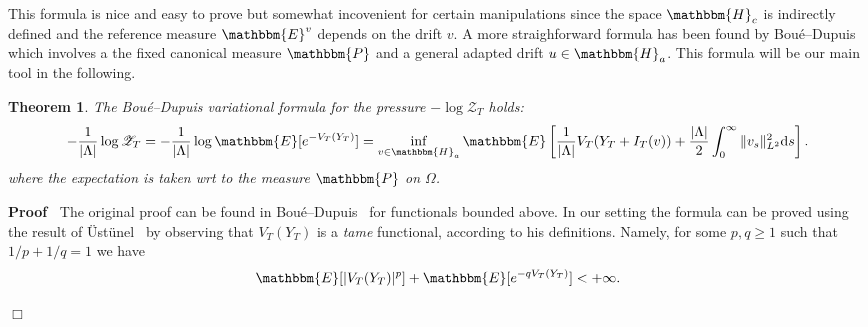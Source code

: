 \documentclass[11pt, oneside]{article}   	%
\newcommand{\mathd}{\mathrm{d}}
\newcommand{\tmtextit}[1]{{\itshape{#1}}}
\newenvironment{proof}{\noindent\textbf{Proof\ }}{\hspace*{\fill}$\Box$\medskip}
\newtheorem{theorem}{Theorem}
\newcommand{\CZ}{\mathscr{Z}}
\begin{document}
This formula is nice and easy to prove but somewhat incovenient for certain
manipulations since the space $\mathbbm{H}_c$ is indirectly defined and the
reference measure $\mathbbm{E}^v$ depends on the drift $v$. A more
straighforward formula has been found by
Bou{\'e}--Dupuis~{\cite{boue_variational_1998}} which involves a the fixed
canonical measure $\mathbbm{P}$ and a general adapted drift $u \in
\mathbbm{H}_a$. This formula will be our main tool in the following.

\begin{theorem}
  \label{th:variational}The Bou{\'e}--Dupuis variational formula for the
  pressure $- \log \CZ_T$ holds:
  \[ - \frac{1}{| \Lambda |} \log \CZ_T = - \frac{1}{| \Lambda |} \log
     \mathbbm{E} [e^{- V_T (Y_T)}] = \inf_{v \in \mathbbm{H}_a} \mathbbm{E}
     \left[ \frac{1}{| \Lambda |} V_T (Y_T + I_T (v)) + \frac{| \Lambda |}{2}
     \int_0^{\infty} \| v_s \|^2_{L^2} \mathd s \right] . \]
  where the expectation is taken wrt to the measure $\mathbbm{P}$ on $\Omega$.
\end{theorem}

\begin{proof}
  The original proof can be found in
  Bou{\'e}--Dupuis~{\cite{boue_variational_1998}} for functionals bounded
  above. In our setting the formula can be proved using the result of
  {\"U}st{\"u}nel~{\cite{ustunel_variational_2014}} by observing that $V_T
  (Y_T)$ is a \tmtextit{tame} functional, according to his definitions.
  Namely, for some $p, q \geqslant 1$ such that $1 / p + 1 / q = 1$ we have
  \[ \mathbbm{E} [| V_T (Y_T) |^p] +\mathbbm{E} [e^{- q V_T (Y_T)}] < + \infty
     . \]
  
\end{proof}
\end{document}
